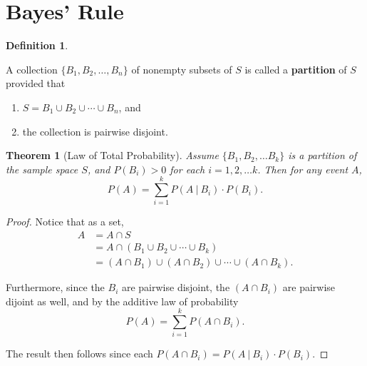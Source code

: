 \documentclass[
]{book}
\providecommand{\tightlist}{%
  \setlength{\itemsep}{0pt}\setlength{\parskip}{0pt}}
\newtheorem{theorem}{Theorem}[chapter]
\theoremstyle{definition}
\newtheorem{definition}{Definition}[chapter]
\theoremstyle{definition}
\theoremstyle{definition}
\theoremstyle{definition}
\theoremstyle{remark}
\begin{document}
\section{Bayes' Rule}\label{bayes-rule}

\begin{definition}
\protect\hypertarget{def:partition}{}\label{def:partition}

A collection \(\{B_1, B_2, \ldots, B_n\}\) of nonempty subsets of \(S\) is called a \textbf{partition} of \(S\) provided that

\begin{enumerate}
\def\labelenumi{\arabic{enumi}.}
\tightlist
\item
  \(S = B_1 \cup B_2 \cup \cdots \cup B_n\), and
\item
  the collection is pairwise disjoint.
\end{enumerate}

\end{definition}

\begin{theorem}[Law of Total Probability]
\protect\hypertarget{thm:total-law-prob}{}\label{thm:total-law-prob}Assume \(\{B_1, B_2, \ldots B_k\}\) is a partition of the sample space \(S\), and \(P(B_i) > 0\) for each \(i = 1, 2, \ldots k\). Then for any event \(A\), \[P(A) = \sum_{i=1}^k P(A~|~B_i)\cdot P(B_i).\]
\end{theorem}

\begin{proof}
Notice that as a set,
\begin{align*}
A &= A \cap S \\
  &= A \cap (B_1 \cup B_2 \cup \cdots \cup B_k) \\
  &= (A \cap B_1) \cup (A \cap B_2) \cup \cdots \cup (A \cap B_k).
\end{align*}

Furthermore, since the \(B_i\) are pairwise disjoint, the \((A \cap B_i)\) are pairwise dijoint as well, and by the additive law of probability \[P(A) = \sum_{i = 1}^k P(A \cap B_i).\]

The result then follows since each \(P(A \cap B_i) = P(A~|~B_i)\cdot P(B_i)\).
\end{proof}
\end{document}
